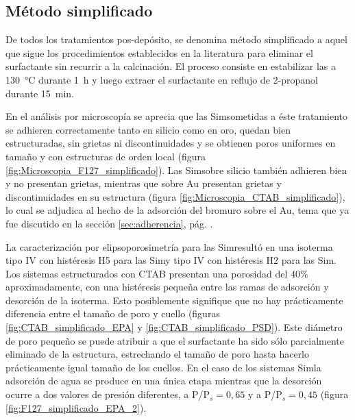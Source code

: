 	 \subsection{Método simplificado}

		 	De todos los tratamientos pos-depósito, se denomina método simplificado a aquel que sigue los procedimientos establecidos en la literatura para eliminar el surfactante sin recurrir a la calcinación.\cite{Angelome2008,Calvo20210,Calvo2010,Fuertes2009} El proceso consiste en estabilizar las \pdm\space a \SI{130}{\celsius} durante \SI{1}{\hour} y luego extraer el surfactante en reflujo de 2-propanol durante \SI{15}{\minute}. 
			
			En el análisis por microscopía se aprecia que las Sim\pdmF\space sometidas a éste tratamiento se adhieren correctamente tanto en silicio como en oro, quedan bien estructuradas, sin grietas ni discontinuidades y se obtienen poros uniformes en tamaño y con estructuras de orden local (figura \ref{fig:Microscopia_F127_simplificado}). Las Sim\pdmC\space sobre silicio también adhieren bien y no presentan grietas, mientras que sobre Au presentan grietas y discontinuidades en su estructura (figura \ref{fig:Microscopia_CTAB_simplificado}), lo cual se adjudica al hecho de la adsorción del bromuro sobre el Au, tema que ya fue discutido en la sección \ref{sec:adherencia}, pág. \pageref{sec:adherencia}. 
			
			La caracterización por elipsoporosimetría para las Sim\pdmF\space resultó en una isoterma tipo IV con histéresis H5 para las Sim\pdmC\space y tipo IV con histéresis H2 para las Sim\pdmF\cite{Thommes2015}. Los sistemas estructurados con CTAB presentan una porosidad del 40\% aproximadamente, con una histéresis pequeña entre las ramas de adsorción y desorción de la isoterma. Esto posiblemente signifique que no hay prácticamente diferencia entre el tamaño de poro y cuello (figuras \ref{fig:CTAB_simplificado_EPA}  y \ref{fig:CTAB_simplificado_PSD}). Este diámetro de poro pequeño se puede atribuir a que el surfactante ha sido sólo parcialmente eliminado de la estructura, estrechando el tamaño de poro hasta hacerlo prácticamente igual tamaño de los cuellos.
			En el caso de los sistemas Sim\pdmF\space la adsorción de agua se produce en una única etapa mientras que la desorción ocurre a dos valores de presión diferentes, a P/P$_s=0,65$ y a P/P$_s=0,45$ (figura \ref{fig:F127_simplificado_EPA_2}). 

